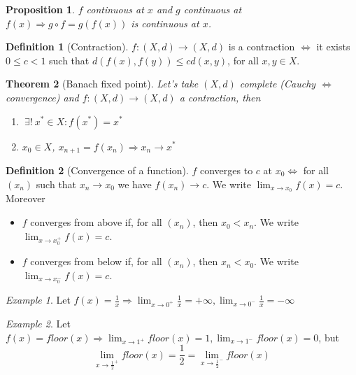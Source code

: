 \documentclass{article}
\newcommand{\DS}{\displaystyle}
\newcommand{\Ar}{\Rightarrow}
\newenvironment{enumrom}{\begin{enumerate}[label=(\roman*)]}{\end{enumerate}}
\newcommand{\fr}[2]{\frac{#1}{#2}}
\newcommand{\f}[3]{#1 : #2 \rightarrow #3}
\newcommand{\limx}[1]{\lim_{x \to #1}}
\theoremstyle{definition}
\newtheorem{definition}{Definition}[section]
\theoremstyle{definition}
\theoremstyle{plain}
\newtheorem{theorem}{Theorem}[section]
\theoremstyle{plain}
\theoremstyle{plain}
\theoremstyle{plain}
\newtheorem{proposition}[theorem]{Proposition}
\theoremstyle{definition}
\theoremstyle{remark}
\newtheorem{exampled}{Example}[definition]
\theoremstyle{remark}
\theoremstyle{remark}
\theoremstyle{remark}
\newcommand{\ExistsI}{\ \exists! \ }
\begin{document}
\begin{proposition}
  $f$ continuous at $x$ and $g$ continuous at $f(x) \Ar g \circ f = g(f(x))$ is continuous at $x$.
\end{proposition}



\begin{definition}[Contraction]
  $\f{f}{(X,d)}{(X,d)}$ is a contraction $\iff$ it exists $0 \leq c < 1$ such that $d(f(x),f(y)) \leq cd(x,y)$, for all $x,y \in X$.
\end{definition}


\begin{theorem}[Banach fixed point]
  Let's take $(X,d)$ complete (Cauchy $\iff$ convergence) and $\f{f}{(X,d)}{(X,d)}$ a contraction, then
  \begin{enumrom}
    \item $\ExistsI x^* \in X : f(x^*) = x^*$
    \item $x_0 \in X$, $x_{n+1} = f(x_n) \Ar x_n \to x^*$
  \end{enumrom}
\end{theorem}


\begin{definition}[Convergence of a function]
  $f$ converges to $c$ at $x_0 \iff$ for all $(x_n)$ such that $x_n \to x_0$ we have $f(x_n) \to c$. We write $\DS \limx{x_0} f(x) = c$. Moreover
  \begin{itemize}
    \item $f$ converges from above if, for all $(x_n)$, then $x_0 < x_n$.
    We write $\DS \limx{x_0^+} f(x) = c$.
    \item $f$ converges from below if, for all $(x_n)$, then $x_n < x_0$.
    We write $\DS \limx{x_0^-} f(x) = c$.
  \end{itemize}
\end{definition}

\begin{exampled}
  Let $\DS f(x) = \fr{1}{x} \Ar \limx{0^+} \fr{1}{x} = +\infty, \limx{0^-} \fr{1}{x} = -\infty$
\end{exampled}

\begin{exampled}
  Let $\DS f(x) = floor(x) \Ar \limx{1^+} floor(x) = 1, \limx{1^-} floor(x) = 0$, but
  \[
  \DS \limx{\fr{1}{2}^+} floor(x) = \fr{1}{2} = \limx{\fr{1}{2}^-} floor(x)
  \]
\end{exampled}
\end{document}
